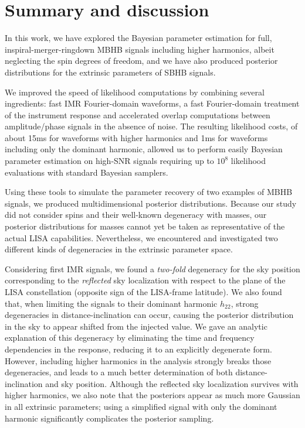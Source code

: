 \documentclass[aps,showpacs,twocolumn,prd,superscriptaddress,nofootinbib]{revtex4-1}
\begin{document}

\section{Summary and discussion}
\label{sec:summarydiscussion}

In this work, we have explored the Bayesian parameter estimation for full, inspiral-merger-ringdown MBHB signals including higher harmonics, albeit neglecting the spin degrees of freedom, and we have also produced posterior distributions for the extrinsic parameters of SBHB signals.

We improved the speed of likelihood computations by combining several ingredients: fast IMR Fourier-domain waveforms, a fast Fourier-domain treatment of the instrument response and accelerated overlap computations between amplitude/phase signals in the absence of noise. The resulting likelihood costs, of about 15ms for waveforms with higher harmonics and 1ms for waveforms including only the dominant harmonic, allowed us to perform easily Bayesian parameter estimation on high-SNR signals requiring up to $10^{8}$ likelihood evaluations with standard Bayesian samplers.

Using these tools to simulate the parameter recovery of two examples of MBHB signals, we produced multidimensional posterior distributions.
Because our study did not consider spins and their well-known degeneracy with masses, our posterior distributions for masses cannot yet be taken as representative of the actual LISA capabilities.
Nevertheless, we encountered and investigated two different kinds of degeneracies in the extrinsic parameter space.

Considering first IMR signals, we found a \textit{two-fold} degeneracy for the sky position corresponding to the \textit{reflected} sky localization with respect to the plane of the LISA constellation (opposite sign of the LISA-frame latitude). We also found that, when limiting the signals to their dominant harmonic $h_{22}$, strong degeneracies in distance-inclination can occur, causing the posterior distribution in the sky to appear shifted from the injected value. We gave an analytic explanation of this degeneracy by eliminating the time and frequency dependencies in the response, reducing it to an explicitly degenerate form. However, including higher harmonics in the analysis strongly breaks those degeneracies, and leads to a much better determination of both distance-inclination and sky position. Although the reflected sky localization survives with higher harmonics, we also note that the posteriors appear as much more Gaussian in all extrinsic parameters; using a simplified signal with only the dominant harmonic significantly complicates the posterior sampling.
\end{document}
